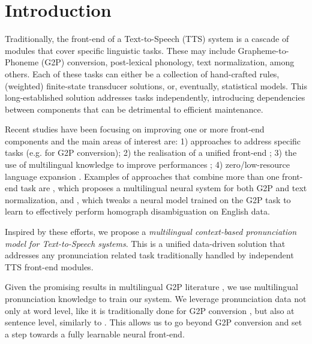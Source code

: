 \section{Introduction}
Traditionally, the front-end of a Text-to-Speech (TTS) system is a cascade of modules that cover specific linguistic tasks. These may include Grapheme-to-Phoneme (G2P) conversion, post-lexical phonology, text normalization, among others. Each of these tasks can either be a collection of hand-crafted rules, (weighted) finite-state transducer solutions, or, eventually, statistical models. This long-established solution addresses tasks independently, introducing dependencies between components that can be detrimental to efficient maintenance. 

Recent studies have been focusing on improving one or more front-end components and the main areas of interest are: 1) approaches to address specific tasks (e.g. \cite{bisaniN08, novakMH12, peters17, multimodal19, amazon20, byt522, Yolchuyeva_2019, char_transformer20, gbert22} for G2P conversion); 
2) the realisation of a unified front-end \cite{gorman-etal-2018-improving, T5G2P_21, apple_frontend20, soundchoice22}; 3) the use of multilingual knowledge to improve performances \cite{deriK16, peters17, multimodal19, amazon20, apple_frontend20, byt522}; 4) zero/low-resource language expansion \cite{byt522, gbert22, sigmorphon20, zeroshot22}. 
Examples of approaches that combine more than one front-end task are \cite{apple_frontend20}, which proposes a multilingual neural system for both G2P and text normalization, and \cite{soundchoice22}, which tweaks a neural model trained on the G2P task to learn to effectively perform homograph disambiguation on English data.

Inspired by these efforts, we propose a \emph{multilingual context-based pronunciation model for Text-to-Speech systems}.
This is a unified data-driven solution that addresses any pronunciation related task traditionally handled by independent TTS front-end modules. 

Given the promising results in multilingual G2P literature \cite{peters17, multimodal19, amazon20, apple_frontend20, byt522, zeroshot22}, we use multilingual pronunciation knowledge
to train our system. We leverage pronunciation data not only at word level, like it is traditionally done for G2P conversion \cite{peters17, Yolchuyeva_2019, char_transformer20, amazon20, gbert22, byt522}, but also at sentence level, similarly to \cite{gorman-etal-2018-improving, multimodal19, apple_frontend20, T5G2P_21, soundchoice22}. This allows us to go beyond G2P conversion and set a step towards a fully learnable neural front-end.


